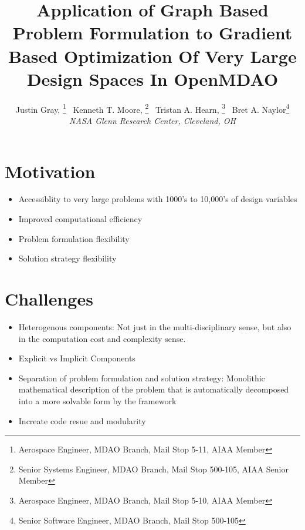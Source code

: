 \documentclass[]{aiaa-tc} %
\title{Application of Graph Based Problem Formulation to Gradient Based Optimization Of Very Large Design Spaces In OpenMDAO}
\author{
  Justin Gray,%
     \thanks{Aerospace Engineer, MDAO Branch, Mail Stop 5-11, AIAA Member}
  \ Kenneth T. Moore,%
     \thanks{Senior Systems Engineer, MDAO Branch, Mail Stop 500-105, AIAA Senior Member}  
   \ Tristan A. Hearn,%
     \thanks{Aerospace Engineer, MDAO Branch, Mail Stop 5-10, AIAA Member}
  \ Bret A. Naylor\thanks{Senior Software Engineer, MDAO Branch, Mail Stop 500-105}\\
  {\normalsize\itshape
  NASA Glenn Research Center, Cleveland, OH}  \\
 }
\begin{document}
  \maketitle
   
  \begin{abstract}

  \end{abstract}

  \section{Motivation}
    \begin{itemize}
      \item Accessiblity to very large problems with 1000's to 10,000's of design variables 
      \item Improved computational efficiency
      \item Problem formulation flexibility 
      \item Solution strategy flexibility
    \end{itemize}

  \section{Challenges}
    \begin{itemize}
      \item Heterogenous components: Not just in the multi-disciplinary sense, but also in the computation cost and complexity sense. 
      \item Explicit vs Implicit Components
      \item Separation of problem formulation and solution strategy: Monolithic mathematical description of the problem that is automatically decomposed into a more solvable form by the framework
      \item Increate code resue and modularity

    \end{itemize}
\end{document}
